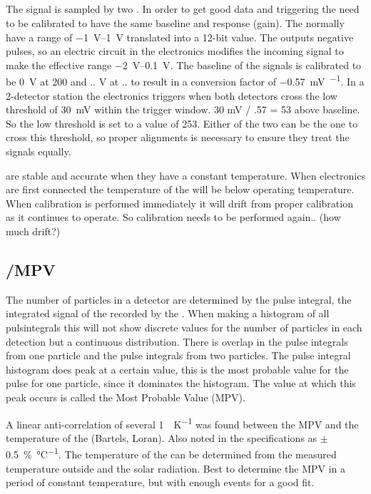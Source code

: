 \subsection{\adcs}

The signal is sampled by two \adcs. In order to get good data and
triggering the \adcs need to be calibrated to have the same baseline and
response (gain). The \adcs normally have a range of
\SIrange{-1}{1}{\volt} translated into a 12-bit value. The \pmt outputs
negative pulses, so an electric circuit in the \hisparc electronics
modifies the incoming signal to make the effective \adc range
\SIrange{-2}{0.1}{\volt}. The baseline of the signals is calibrated to
be \SI{0}{\volt} at \SI{200}{\adc} and .. V at .. \Adcs to result in a
conversion factor of \SI{-0.57}{\milli\volt\per\adc}. In a 2-detector
station the \hisparc electronics triggers when both detectors cross the
low threshold of \SI{30}{\milli\volt} within the trigger window. 30 mV /
.57 = 53 above baseline. So the low threshold is set to a value of
\SI{253}{\adc}. Either of the two \adcs can be the one to cross this
threshold, so proper \adc alignments is necessary to ensure they treat
the signals equally.

\adcs are stable and accurate when they have a constant temperature.
When \hisparc electronics are first connected the temperature of the
\adcs will be below operating temperature. When calibration is performed
immediately it will drift from proper calibration as it continues to
operate. So calibration needs to be performed again.. (how much drift?)


\subsection{\mip/MPV}

The number of particles in a detector are determined by the pulse
integral, the integrated signal of the \pmt recorded by the \adc. When
making a histogram of all pulsintegrals this will not show discrete
values for the number of particles in each detection but a continuous
distribution. There is overlap in the pulse integrals from one particle
and the pulse integrals from two particles. The pulse integral histogram
does peak at a certain value, this is the most probable value for the
pulse for one particle, since it dominates the histogram. The value at
which this peak occurs is called the Most Probable Value (MPV).

A linear anti-correlation of several \SI{1}{\adc\per\kelvin} was found
between the MPV and the temperature of the \pmt (Bartels, Loran). Also
noted in the specifications as $\pm$
\SI{.5}{\percent\per\degreeCelsius}. The temperature of the \pmt can be
determined from the measured temperature outside and the solar
radiation. Best to determine the MPV in a period of constant
temperature, but with enough events for a good fit.


